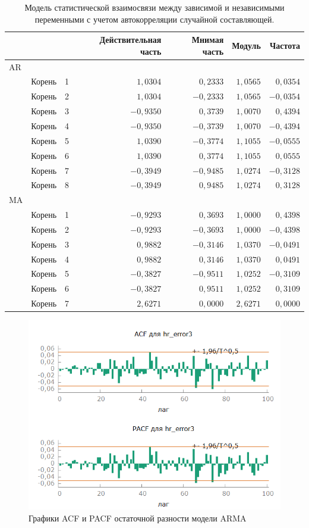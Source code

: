 \documentclass[a4paper,12pt]{article}
\begin{document}
\begin{table}[H]
\begin{center}
	
	\vspace{1em}
	
	\begin{tabular}{llrrrrr}
		& & & Действительная часть & Мнимая часть & Модуль & Частота \\ \hline
		AR \\ 
		& Корень & 1 & $1,0304$ & $0,2333$ & $1,0565$ & $0,0354$ \\ 
		& Корень & 2 & $1,0304$ & $-0,2333$ & $1,0565$ & $-0,0354$ \\ 
		& Корень & 3 & $-0,9350$ & $0,3739$ & $1,0070$ & $0,4394$ \\ 
		& Корень & 4 & $-0,9350$ & $-0,3739$ & $1,0070$ & $-0,4394$ \\ 
		& Корень & 5 & $1,0390$ & $-0,3774$ & $1,1055$ & $-0,0555$ \\ 
		& Корень & 6 & $1,0390$ & $0,3774$ & $1,1055$ & $0,0555$ \\ 
		& Корень & 7 & $-0,3949$ & $-0,9485$ & $1,0274$ & $-0,3128$ \\ 
		& Корень & 8 & $-0,3949$ & $0,9485$ & $1,0274$ & $0,3128$ \\ 
		MA \\ 
		& Корень & 1 & $-0,9293$ & $0,3693$ & $1,0000$ & $0,4398$ \\ 
		& Корень & 2 & $-0,9293$ & $-0,3693$ & $1,0000$ & $-0,4398$ \\ 
		& Корень & 3 & $0,9882$ & $-0,3146$ & $1,0370$ & $-0,0491$ \\ 
		& Корень & 4 & $0,9882$ & $0,3146$ & $1,0370$ & $0,0491$ \\ 
		& Корень & 5 & $-0,3827$ & $-0,9511$ & $1,0252$ & $-0,3109$ \\ 
		& Корень & 6 & $-0,3827$ & $0,9511$ & $1,0252$ & $0,3109$ \\ 
		& Корень & 7 & $2,6271$ & $0,0000$ & $2,6271$ & $0,0000$ \\ \hline
	\end{tabular}
	
\end{center}
\caption{Модель статистической взаимосвязи между зависимой и независимыми переменными с учетом автокорреляции случайной составляющей.}
\label{tab:table4}
\end{table}

\begin{figure}[H]
	\centering
	\includegraphics[width=0.5\linewidth]{../[graphics]/hr_error3_acf_100.png}
	\caption{Графики ACF и PACF остаточной разности модели ARMA}
	\label{fig:hr_error3_acf_100}
\end{figure}
\end{document}
